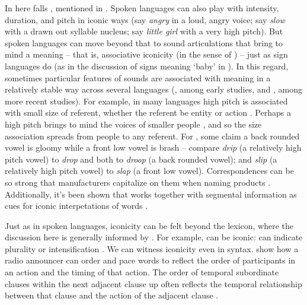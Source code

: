 \documentclass[output=paper,
modfonts
]{LSP/langsci}
\begin{document}
In here falls , mentioned in . Spoken languages can
also play with intensity, duration, and pitch in iconic ways (say
\emph{angry} in a loud, angry voice; say \emph{slow} with a drawn out
syllable nucleus; say \emph{little girl} with a very high pitch). But
spoken languages can move beyond that to sound articulations that bring
to mind a meaning -- that is, associative iconicity (in the sense of
\citealt{fischer1999}) -- just as sign languages do (as in the discussion of
signs meaning `baby' in ). In this regard, sometimes particular
features of sounds are associated with meaning in a relatively stable
way across several languages (\citealt{sapir1929n,taylor1963,werner1952,wertheimer1958}, among early studies, and \citealt{hinton1994,voeltz2001}, among more recent studies). For
example, in many languages high pitch is associated with small size of
referent, whether the referent be entity or action \citep{jespersen1922n,nuckolls1999}. Perhaps a high pitch brings to mind the voices of
smaller people \citep{evans2006}, and so the size
association spreads from people to any referent. For , some claim
a back rounded vowel is gloomy while a front low vowel is brash --
compare  \emph{drip} (a relatively high pitch vowel) to
\emph{drop} and both to \emph{droop} (a back rounded vowel); and
\emph{slip} (a relatively high pitch vowel) to \emph{slap} (a front low
vowel). Correspondences can be so strong that manufacturers capitalize
on them when naming products \citep{spence2012}. Additionally, it's been
shown that  works together with segmental information as cues for
iconic interpetations of words \citep{dingemanse2016}.

Just as in spoken languages, iconicity can be felt beyond the lexicon,
where the discussion here is generally informed by \citet{fabisiak2011}. For example,  can be iconic: 
\citep{moravcsik1978n} can indicate plurality \citep{macdonald1976} or
intensification \citep{murane1974}. We can witness iconicity even in syntax.
\citet{moulton1981} show how a radio announcer can order and
pace words to reflect the order of participants in an action and the
timing of that action. The order of temporal subordinate clauses within
the next adjacent clause up often reflects the temporal relationship
between that clause and the action of the adjacent clause \citep{haiman1985n,kortmann1991,diessel2005}.
\end{document}
